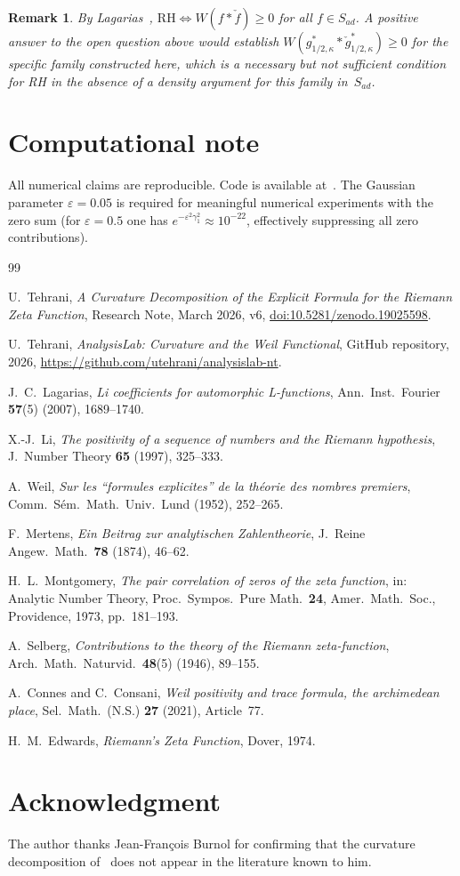 \documentclass[11pt]{article}
\newtheorem*{remark*}{Remark}
\begin{document}
\begin{remark*}
By Lagarias~\cite{lagarias},
$\mathrm{RH} \iff W(f*\check f)\ge 0$ for all $f\in S_{ad}$.
A positive answer to the open question above would establish
$W(g^*_{1/2,\kappa}*\check g^*_{1/2,\kappa})\ge 0$ for the specific
family constructed here, which is a necessary but not sufficient
condition for RH in the absence of a density argument for this
family in~$S_{ad}$.
\end{remark*}

\section*{Computational note}

All numerical claims are reproducible. Code is available at~\cite{github}.
The Gaussian parameter $\varepsilon = 0.05$ is required for meaningful
numerical experiments with the zero sum (for $\varepsilon = 0.5$ one has
$e^{-\varepsilon^2\gamma_1^2} \approx 10^{-22}$, effectively
suppressing all zero contributions).

\begin{thebibliography}{99}

U.~Tehrani,
\emph{A Curvature Decomposition of the Explicit Formula
for the Riemann Zeta Function},
Research Note, March 2026, v6,
\href{https://doi.org/10.5281/zenodo.19025598}{%
doi:10.5281/zenodo.19025598}.

U.~Tehrani,
\emph{AnalysisLab: Curvature and the Weil Functional},
GitHub repository, 2026,
\url{https://github.com/utehrani/analysislab-nt}.

J.~C.~Lagarias,
\emph{Li coefficients for automorphic L-functions},
Ann.\ Inst.\ Fourier \textbf{57}(5) (2007), 1689--1740.

X.-J.~Li,
\emph{The positivity of a sequence of numbers
and the Riemann hypothesis},
J.\ Number Theory \textbf{65} (1997), 325--333.

A.~Weil,
\emph{Sur les ``formules explicites'' de la
th\'eorie des nombres premiers},
Comm.\ S\'em.\ Math.\ Univ.\ Lund (1952), 252--265.

F.~Mertens,
\emph{Ein Beitrag zur analytischen Zahlentheorie},
J.\ Reine Angew.\ Math.\ \textbf{78} (1874), 46--62.

H.~L.~Montgomery,
\emph{The pair correlation of zeros of the zeta function},
in: Analytic Number Theory, Proc.\ Sympos.\ Pure Math.\ \textbf{24},
Amer.\ Math.\ Soc., Providence, 1973, pp.\ 181--193.

A.~Selberg,
\emph{Contributions to the theory of the Riemann zeta-function},
Arch.\ Math.\ Naturvid.\ \textbf{48}(5) (1946), 89--155.

A.~Connes and C.~Consani,
\emph{Weil positivity and trace formula, the archimedean place},
Sel.\ Math.\ (N.S.) \textbf{27} (2021), Article~77.

H.~M.~Edwards,
\emph{Riemann's Zeta Function},
Dover, 1974.

\end{thebibliography}

\section*{Acknowledgment}

The author thanks Jean-Fran\c{c}ois Burnol for confirming that the
curvature decomposition of~\cite{paper1} does not appear in the
literature known to him.
\end{document}
